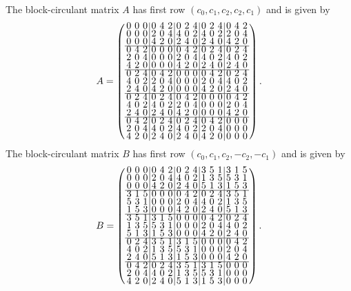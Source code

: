 \documentclass[../../main]{subfiles}
\begin{document}
The block-circulant matrix $A$ has first row $(c_0,c_1,c_2,c_2,c_1)$ and is
given by
\[
  A = \left(
    \arraycolsep=1.75pt\def\arraystretch{0.5}
    \begin{array}{ccc|ccc|ccc|ccc|ccc}
      0&0&0&0&4&2&0&2&4&0&2&4&0&4&2\\
      0&0&0&2&0&4&4&0&2&4&0&2&2&0&4\\
      0&0&0&4&2&0&2&4&0&2&4&0&4&2&0\\ \hline
      0&4&2&0&0&0&0&4&2&0&2&4&0&2&4\\
      2&0&4&0&0&0&2&0&4&4&0&2&4&0&2\\
      4&2&0&0&0&0&4&2&0&2&4&0&2&4&0\\ \hline
      0&2&4&0&4&2&0&0&0&0&4&2&0&2&4\\
      4&0&2&2&0&4&0&0&0&2&0&4&4&0&2\\
      2&4&0&4&2&0&0&0&0&4&2&0&2&4&0\\ \hline
      0&2&4&0&2&4&0&4&2&0&0&0&0&4&2\\
      4&0&2&4&0&2&2&0&4&0&0&0&2&0&4\\
      2&4&0&2&4&0&4&2&0&0&0&0&4&2&0\\ \hline
      0&4&2&0&2&4&0&2&4&0&4&2&0&0&0\\
      2&0&4&4&0&2&4&0&2&2&0&4&0&0&0\\
      4&2&0&2&4&0&2&4&0&4&2&0&0&0&0\\
    \end{array}
  \right).
\]
The block-circulant matrix $B$ has first row $(c_0,c_1,c_2,-c_2,-c_1)$ and is
given by
\[
  B = \left(
    \arraycolsep=1.75pt\def\arraystretch{0.5}
    \begin{array}{ccc|ccc|ccc|ccc|ccc}
      0&0&0&0&4&2&0&2&4&3&5&1&3&1&5\\
      0&0&0&2&0&4&4&0&2&1&3&5&5&3&1\\
      0&0&0&4&2&0&2&4&0&5&1&3&1&5&3\\ \hline
      3&1&5&0&0&0&0&4&2&0&2&4&3&5&1\\
      5&3&1&0&0&0&2&0&4&4&0&2&1&3&5\\
      1&5&3&0&0&0&4&2&0&2&4&0&5&1&3\\ \hline
      3&5&1&3&1&5&0&0&0&0&4&2&0&2&4\\
      1&3&5&5&3&1&0&0&0&2&0&4&4&0&2\\
      5&1&3&1&5&3&0&0&0&4&2&0&2&4&0\\ \hline
      0&2&4&3&5&1&3&1&5&0&0&0&0&4&2\\
      4&0&2&1&3&5&5&3&1&0&0&0&2&0&4\\
      2&4&0&5&1&3&1&5&3&0&0&0&4&2&0\\ \hline
      0&4&2&0&2&4&3&5&1&3&1&5&0&0&0\\
      2&0&4&4&0&2&1&3&5&5&3&1&0&0&0\\
      4&2&0&2&4&0&5&1&3&1&5&3&0&0&0\\
    \end{array}
  \right).
\]
\end{document}
